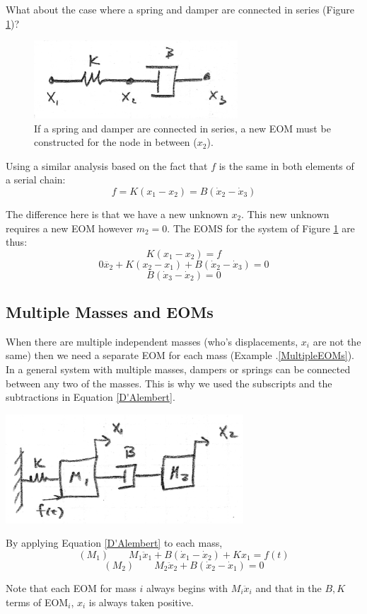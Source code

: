 What about the case where a spring and damper are connected in series (Figure \ref{springseriesdamper})?


\begin{figure}\centering
\includegraphics[width=3.0in]{figs02/00725a.png}
\caption{If a spring and damper are connected in series, a new EOM must be constructed for the node in between ($x_2$).}\label{springseriesdamper}
\end{figure}

Using a similar analysis based on the fact that $f$ is the same in both elements of a serial chain:
\[
f = K(x_1-x_2) = B(\dot{x}_2-\dot{x}_3)
\]

The difference here is that we have a new unknown $x_2$.    This new unknown requires a new EOM however $m_2 =0$.   The EOMS for the system of Figure \ref{springseriesdamper} are thus:
\[
K(x_1-x_2) = f
\]
\[
0\ddot{x_2} + K(x_2-x_1) + B(\dot{x}_2-\dot{x}_3) = 0
\]
\[
B(\dot{x}_3-\dot{x}_2) = 0
\]






\subsection{Multiple Masses and EOMs}
When there are multiple independent masses (who's displacements, $x_i$ are not the same) then we need a separate EOM for each mass (Example \thechapter.\ref{MultipleEOMs}).
In a general system with multiple masses, dampers or springs can be connected between any two of the masses.  This is why we used the subscripts and the subtractions in Equation \ref{D'Alembert}.



\begin{ExampleSmall}\label{MultipleEOMs}


\includegraphics[width=3.5in]{figs02/00726a.png}



By applying Equation \ref{D'Alembert} to each mass,
\[
(M_1) \qquad M_1\ddot{x}_1 + B(\dot{x}_1 - \dot{x}_2) + Kx_1 = f(t)
\]
\[
(M_2) \qquad M_2\ddot{x}_2 + B(\dot{x}_2-\dot{x}_1)  = 0
\]

Note that each EOM for mass $i$ always begins with $M_i\ddot{x}_i$ and that in the $B,K$ terms of EOM$_i$, $x_i$ is always taken positive.
\end{ExampleSmall}





